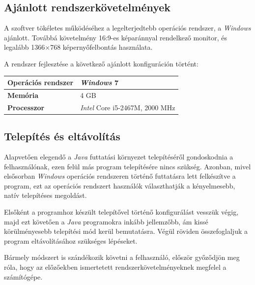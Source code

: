 \documentclass{elteikthesis}
\begin{document}
\subsection{Ajánlott rendszerkövetelmények}
A szoftver tökéletes működéséhez a legelterjedtebb operációs rendszer, a \emph{Windows} ajánlott. Továbbá követelmény 16:9-es képaránnyal rendelkező monitor, és legalább 1366$\times$768 képernyőfelbontás használata.\par
A rendszer fejlesztése a következő ajánlott konfiguráción történt:
\begin{table}[H]
	\def\arraystretch{2}
	\centering
	\begin{tabular}{|l|l|}
		\hline
		\textbf{Operációs rendszer} & \emph{Windows} 7                     \\ \hline
		\textbf{Memória}            & 4 GB                          \\ \hline
		\textbf{Processzor}         & \emph{Intel} Core i5-2467M, 2000 MHz \\ \hline
	\end{tabular}
\end{table}

\subsection{Telepítés és eltávolítás}
Alapvetően elegendő a \emph{Java} futtatási környezet telepítéséről gondoskodnia a felhasználónak, ezen felül más program telepítésére nincs szükség. Azonban, mivel elsősorban \emph{Windows} operációs rendszeren történő futtatásra lett felkészítve a program, ezt az operációs rendszert használók választhatják a kényelmesebb, natív telepítéses megoldást.\par
Elsőként a programhoz készült telepítővel történő konfigurálást vesszük végig, majd ezt követően a \emph{Java} programokra inkább jellemzőbb, ám kissé körülményesebb telepítési mód kerül bemutatásra. Végül röviden összefoglaljuk a program eltávolításához szükséges lépéseket.
\par Bármely módszert is szándékozik követni a felhasználó, először győződjön meg róla, hogy az előzőekben ismertetett rendszerkövetelményeknek megfelel a számítógépe.
\end{document}
